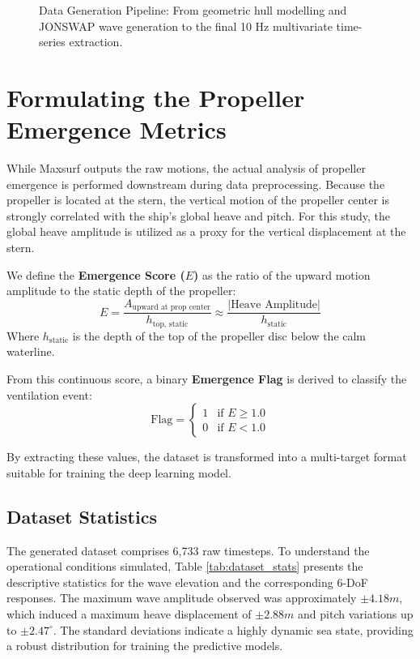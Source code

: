\begin{figure}[H]
    \caption{Data Generation Pipeline: From geometric hull modelling and JONSWAP wave generation to the final 10 Hz multivariate time-series extraction.}
    \label{fig:sim_pipeline}
\end{figure}

\section{Formulating the Propeller Emergence Metrics}
While Maxsurf outputs the raw motions, the actual analysis of propeller emergence is performed downstream during data preprocessing. Because the propeller is located at the stern, the vertical motion of the propeller center is strongly correlated with the ship's global heave and pitch. For this study, the global heave amplitude is utilized as a proxy for the vertical displacement at the stern.

We define the \textbf{Emergence Score ($E$)} as the ratio of the upward motion amplitude to the static depth of the propeller:
\begin{equation}
    E = \frac{A_{\text{upward at prop center}}}{h_{\text{top, static}}} \approx \frac{|\text{Heave Amplitude}|}{h_{\text{static}}}
\end{equation}
Where $h_{\text{static}}$ is the depth of the top of the propeller disc below the calm waterline. 

From this continuous score, a binary \textbf{Emergence Flag} is derived to classify the ventilation event:
\begin{equation}
    \text{Flag} = 
    \begin{cases} 
      1 & \text{if } E \geq 1.0 \\
      0 & \text{if } E < 1.0
    \end{cases}
\end{equation}

By extracting these values, the dataset is transformed into a multi-target format suitable for training the deep learning model.

\subsection{Dataset Statistics}
The generated dataset comprises 6,733 raw timesteps. To understand the operational conditions simulated, Table \ref{tab:dataset_stats} presents the descriptive statistics for the wave elevation and the corresponding 6-DoF responses. The maximum wave amplitude observed was approximately $\pm 4.18m$, which induced a maximum heave displacement of $\pm 2.88m$ and pitch variations up to $\pm 2.47^\circ$. The standard deviations indicate a highly dynamic sea state, providing a robust distribution for training the predictive models.

